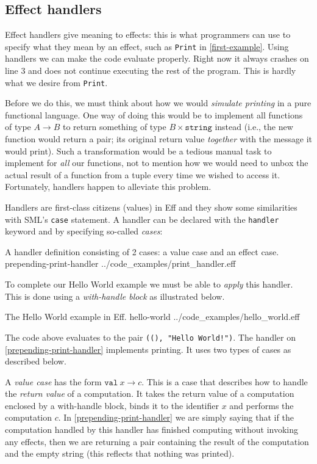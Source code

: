 \documentclass[class=article, crop=false]{standalone}
\begin{document}
\subsection{Effect handlers}

Effect handlers give meaning to effects: this is what programmers can use to
specify what they mean by an effect, such as \lstinline{Print} in
\autoref{first-example}. Using handlers we can make the code evaluate properly.
Right now it always crashes on line 3 and does not continue executing the rest
of the program. This is hardly what we desire from \lstinline{Print}.

Before we do this, we must think about how we would \emph{simulate printing} in
a pure functional language. One way of doing this would be to implement all
functions of type $A \to B$ to return something of type $B \times \mathtt{string}$
instead (i.e., the new function would return a pair; its original return value
\emph{together} with the message it would print). Such a transformation would be
a tedious manual task to implement for \emph{all} our functions, not to mention
how we would need to unbox the actual result of a function from a tuple every
time we wished to access it. Fortunately, handlers happen to alleviate this
problem.

Handlers are first-class citizens (values) in Eff and they show some similarities
with SML's \lstinline|case| statement. A handler can be declared with the
\lstinline|handler| keyword and by specifying so-called \emph{cases}:

{A handler definition consisting of 2 cases: a value case and an effect case.}
{prepending-print-handler}
{../code_examples/print_handler.eff}

To complete our Hello World example we must be able to \emph{apply} this handler.
This is done using a \emph{with-handle block} as illustrated below.

{The Hello World example in Eff.}
{hello-world}
{../code_examples/hello_world.eff}

The code above evaluates to the pair \texttt{((), "Hello World!")}. The handler
on \autoref{prepending-print-handler} implements printing. It uses two types of
cases as described below.

A \emph{value case} has the form $\mathtt{val}\ x \to c$. This is a case that
describes how to handle the \emph{return value} of a computation. It takes the
return value of a computation enclosed by a with-handle block, binds it to the
identifier $x$ and performs the computation $c$. In \autoref{prepending-print-handler}
we are simply saying that if the computation handled by this handler has finished
computing without invoking any effects, then we are returning a pair containing
the result of the computation and the empty string (this reflects that nothing
was printed).
\end{document}
